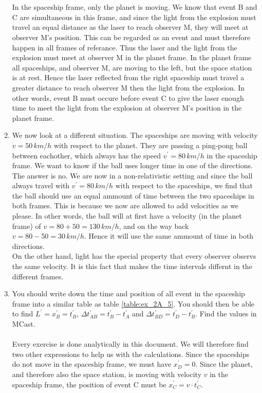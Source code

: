 \documentclass[a4paper,10pt,english]{article}
\begin{document}
\begin{enumerate}
\\ \\
In the spaceship frame, only the planet is moving. We know that event B and C are simultaneous in this frame, and since the light from the explosion must travel an equal distance as the laser to reach observer M, they will meet at observer M's position. This can be regarded as an event and must therefore happen in all frames of referance. Thus the laser and the light from the explosion must meet at observer M in the planet frame. In the planet frame all spaceships, and observer M, are moving to the left, but the space station is at rest. Hence the laser reflected from the right spaceship must travel a greater distance to reach observer M then the light from the explosion. In other words, event B must occure before event C to give the laser enough time to meet the light from the explosion at observer M's position in the planet frame.
\item We now look at a different situation. The spaceships are moving with velocity $v=50\,km/h$ with respect to the planet. They are passing a ping-pong ball between eachother, which always has the speed $v^{\prime}=80\,km/h$ in the spaceship frame. We want to know if the ball uses longer time in one of the directions. The answer is no. We are now in a non-relativistic setting and since the ball always travel with $v^{\prime}=80\,km/h$ with respect to the spaceships, we find that the ball should use an equal ammount of time between the two spaceships in both frames. This is because we now are allowed to add velocities as we please. In other words, the ball will at first have a velocity (in the planet frame) of $v=80+50=130\,km/h$, and on the way back $v=80-50=30\,km/h$. Hence it will use the same ammount of time in both directions. 
\\
On the other hand, light has the special property that every observer observs the same velocity. It is this fact that makes the time intervals differnt in the different frames.
\item You should write down the time and position of all event in the spaceship frame into a similar table as table \ref{table:ex_2A_5}. You should then be able to find $L^{\prime}=x_{B}^{\prime}=t_{B}^{\prime}$, $\Delta t_{AB}^{\prime}=t_{B}^{\prime}-t_{A}^{\prime}$ and $\Delta t_{BD}^{\prime}=t_{D}^{\prime}-t_{B}^{\prime}$. Find the values in MCast.
\\
\\
Every exercise is done analytically in this document. We will therefore find two other expressions to help us with the calculations. Since the spaceships do not move in the spaceship frame, we must have $x^{\prime}_{D}=0$. Since the planet, and therefore also the space station, is moving with velocity $v$ in the spaceship frame, the position of event C must be $x_{C}^{\prime}=v\cdot t_{C}^{\prime}$.

\end{enumerate}
\end{document}
